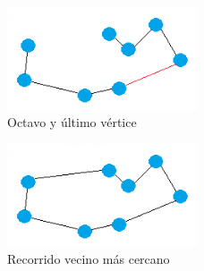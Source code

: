 \begin{frame}
	\begin{exampleblock}{ } 
	\begin{figure}[htbH] 
		\centering
		\includegraphics[width=0.5\textwidth]{./Imagenes/arista8.png}
		\caption{Octavo y último vértice} 
	\end{figure}
	\end{exampleblock}
\end{frame}

\begin{frame}
	\begin{exampleblock}{ }
	\begin{figure}[htbH] 
		\centering
		\includegraphics[width=0.5\textwidth]{./Imagenes/arista9.png}
		\caption{Recorrido vecino más cercano} 
	\end{figure}
	\end{exampleblock}
\end{frame}
